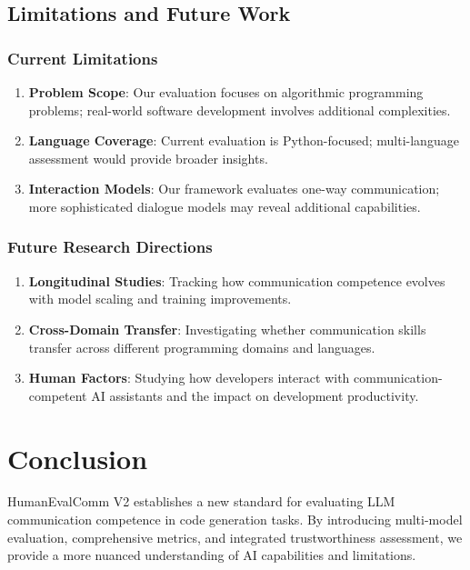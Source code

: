 \documentclass[conference]{IEEEtran}
\begin{document}
\subsection{Limitations and Future Work}

\subsubsection{Current Limitations}

\begin{enumerate}
    \item \textbf{Problem Scope}: Our evaluation focuses on algorithmic programming problems; real-world software development involves additional complexities.
    \item \textbf{Language Coverage}: Current evaluation is Python-focused; multi-language assessment would provide broader insights.
    \item \textbf{Interaction Models}: Our framework evaluates one-way communication; more sophisticated dialogue models may reveal additional capabilities.
\end{enumerate}

\subsubsection{Future Research Directions}

\begin{enumerate}
    \item \textbf{Longitudinal Studies}: Tracking how communication competence evolves with model scaling and training improvements.
    \item \textbf{Cross-Domain Transfer}: Investigating whether communication skills transfer across different programming domains and languages.
    \item \textbf{Human Factors}: Studying how developers interact with communication-competent AI assistants and the impact on development productivity.
\end{enumerate}

\section{Conclusion}

HumanEvalComm V2 establishes a new standard for evaluating LLM communication competence in code generation tasks. By introducing multi-model evaluation, comprehensive metrics, and integrated trustworthiness assessment, we provide a more nuanced understanding of AI capabilities and limitations.
\end{document}
